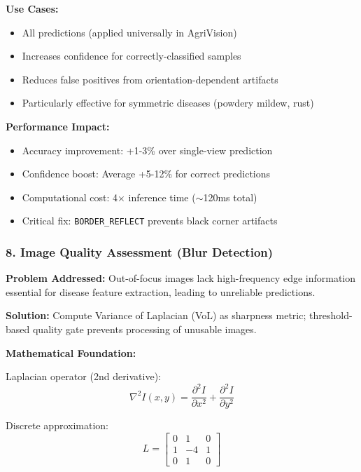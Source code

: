 \documentclass[12pt,a4paper]{article}
\begin{document}
\textbf{Use Cases:}
\begin{itemize}
    \item All predictions (applied universally in AgriVision)
    \item Increases confidence for correctly-classified samples
    \item Reduces false positives from orientation-dependent artifacts
    \item Particularly effective for symmetric diseases (powdery mildew, rust)
\end{itemize}

\textbf{Performance Impact:}
\begin{itemize}
    \item Accuracy improvement: +1-3\% over single-view prediction
    \item Confidence boost: Average +5-12\% for correct predictions
    \item Computational cost: 4× inference time ($\sim$120ms total)
    \item Critical fix: \texttt{BORDER\_REFLECT} prevents black corner artifacts
\end{itemize}

\subsubsection*{8. Image Quality Assessment (Blur Detection)}

\textbf{Problem Addressed:} Out-of-focus images lack high-frequency edge information essential for disease feature extraction, leading to unreliable predictions.

\textbf{Solution:} Compute Variance of Laplacian (VoL) as sharpness metric; threshold-based quality gate prevents processing of unusable images.

\textbf{Mathematical Foundation:}

Laplacian operator (2nd derivative):
\begin{equation*}
    \nabla^2 I(x, y) = \frac{\partial^2 I}{\partial x^2} + \frac{\partial^2 I}{\partial y^2}
\end{equation*}

Discrete approximation:
\begin{equation*}
    L = \begin{bmatrix} 0 & 1 & 0 \\ 1 & -4 & 1 \\ 0 & 1 & 0 \end{bmatrix}
\end{equation*}
\end{document}
